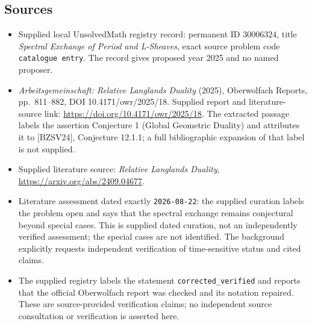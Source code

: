 \documentclass[11pt]{article}
\begin{document}
\subsection{Sources}
\begin{itemize}
\item Supplied local UnsolvedMath registry record: permanent ID \(30006324\), title \emph{Spectral Exchange of Period and L-Sheaves}, exact source problem code \texttt{catalogue entry}. The record gives proposed year 2025 and no named proposer.
\item \emph{Arbeitsgemeinschaft: Relative Langlands Duality} (2025), Oberwolfach Reports, pp.\ 811--882, DOI 10.4171/owr/2025/18. Supplied report and literature-source link: \url{https://doi.org/10.4171/owr/2025/18}. The extracted passage labels the assertion Conjecture 1 (Global Geometric Duality) and attributes it to [BZSV24], Conjecture 12.1.1; a full bibliographic expansion of that label is not supplied.
\item Supplied literature source: \emph{Relative Langlands Duality}, \url{https://arxiv.org/abs/2409.04677}.
\item Literature assessment dated exactly \texttt{2026-08-22}: the supplied curation labels the problem open and says that the spectral exchange remains conjectural beyond special cases. This is supplied dated curation, not an independently verified assessment; the special cases are not identified. The background explicitly requests independent verification of time-sensitive status and cited claims.
\item The supplied registry labels the statement \texttt{corrected\_verified} and reports that the official Oberwolfach report was checked and its notation repaired. These are source-provided verification claims; no independent source consultation or verification is asserted here.
\end{itemize}
\end{document}
